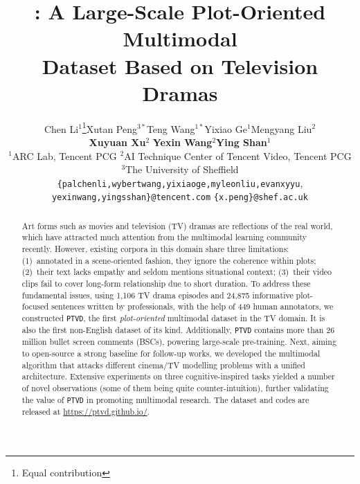 \documentclass{article}
\title{\TVD: A Large-Scale Plot-Oriented Multimodal\\ Dataset Based on Television Dramas}
\author{%
  Chen Li$^{1}$\thanks{Equal contribution}\hspace{0.4cm}Xutan Peng$^{3*}$\hspace{0.4cm}Teng Wang$^{1*}$\hspace{0.4cm}Yixiao Ge$^1$\hspace{0.4cm}Mengyang Liu$^2$\\\textbf{Xuyuan Xu}$^2$\hspace{0.4cm}
  \textbf{Yexin Wang$^2$\hspace{0.4cm}Ying Shan$^1$}\\
  $^1$ARC Lab, Tencent PCG \hspace{0.4cm} $^2$AI Technique Center of Tencent Video, Tencent PCG\\
  $^3$The University of Sheffield\\
  \texttt{\{palchenli,wybertwang,yixiaoge,myleonliu,evanxyyu},\\
  \texttt{yexinwang,yingsshan\}@tencent.com} \hspace{0.4cm}
\texttt{\{x.peng\}@shef.ac.uk}
}
\newcommand{\TVD}{\texttt{PTVD}\xspace}
\begin{document}
\maketitle

\vspace{0.1in}

\begin{abstract}
Art forms such as movies and television (TV) dramas are reflections of the real world, which have attracted much attention from the multimodal learning community recently. However, existing corpora in this domain share three limitations: (1)~annotated in a scene-oriented fashion, they ignore the coherence within plots; (2)~their text lacks empathy and seldom mentions situational context; (3)~their video clips fail to cover long-form relationship due to short duration. To address these fundamental issues, using 1,106 TV drama episodes and 24,875 informative plot-focused sentences written by professionals, with the help of 449 human annotators, we constructed \TVD, the first \textit{plot-oriented} multimodal dataset in the TV domain. It is also the first non-English dataset of its kind. Additionally, \TVD contains more than 26 million bullet screen comments (BSCs), powering large-scale pre-training. Next, aiming to open-source a strong baseline for follow-up works, we developed the multimodal algorithm that attacks different cinema/TV modelling problems with a unified architecture. Extensive experiments on three cognitive-inspired tasks yielded a number of novel observations (some of them being quite counter-intuition), further validating the value of \TVD in promoting multimodal research. The dataset and codes are released at \url{https://ptvd.github.io/}.
\end{abstract}

\vspace{0.1in}













% 
% 

\end{document}
